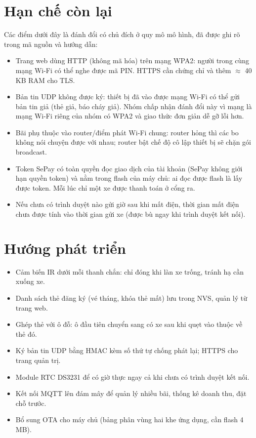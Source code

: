 \section{Hạn chế còn lại}\label{sec:conlai}
Các điểm dưới đây là đánh đổi có chủ đích ở quy mô mô hình, đã được ghi rõ trong mã
nguồn và hướng dẫn:
\begin{itemize}
  \item Trang web dùng HTTP (không mã hóa) trên mạng WPA2: người trong cùng mạng Wi-Fi có
        thể nghe được mã PIN. HTTPS cần chứng chỉ và thêm $\approx$ 40\,KB RAM cho TLS.
  \item Bản tin UDP không được ký: thiết bị đã vào được mạng Wi-Fi có thể gửi bản tin giả
        (thẻ giả, báo cháy giả). Nhóm chấp nhận đánh đổi này vì mạng là mạng Wi-Fi riêng của
        nhóm có WPA2 và giao thức đơn giản dễ gỡ lỗi hơn.
  \item Bãi phụ thuộc vào router/điểm phát Wi-Fi chung: router hỏng thì các bo không nói
        chuyện được với nhau; router bật chế độ cô lập thiết bị sẽ chặn gói broadcast.
  \item Token SePay có toàn quyền đọc giao dịch của tài khoản (SePay không giới hạn quyền
        token) và nằm trong flash của máy chủ: ai đọc được flash là lấy được token.
        Mỗi lúc chỉ một xe được thanh toán ở cổng ra.
  \item Nếu chưa có trình duyệt nào gửi giờ sau khi mất điện, thời gian mất điện chưa
        được tính vào thời gian gửi xe (được bù ngay khi trình duyệt kết nối).
\end{itemize}

\section{Hướng phát triển}
\begin{itemize}
  \item Cảm biến IR dưới mỗi thanh chắn: chỉ đóng khi làn xe trống, tránh hạ cần xuống xe.
  \item Danh sách thẻ đăng ký (vé tháng, khóa thẻ mất) lưu trong NVS, quản lý từ trang web.
  \item Ghép thẻ với ô đỗ: ô đầu tiên chuyển sang có xe sau khi quẹt vào thuộc về thẻ đó.
  \item Ký bản tin UDP bằng HMAC kèm số thứ tự chống phát lại; HTTPS cho trang quản trị.
  \item Module RTC DS3231 để có giờ thực ngay cả khi chưa có trình duyệt kết nối.
  \item Kết nối MQTT lên đám mây để quản lý nhiều bãi, thống kê doanh thu, đặt chỗ trước.
  \item Bổ sung OTA cho máy chủ (bảng phân vùng hai khe ứng dụng, cần flash 4\,MB).
\end{itemize}
